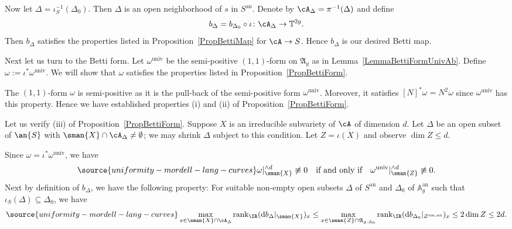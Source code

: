 Now let $\Delta = \iota_S^{-1}(\Delta_0)$. Then $\Delta$ is an open neighborhood of $s$ in $S^{\mathrm{an}}$. Denote by $\cA_{\Delta} = \pi^{-1}(\Delta)$ and define
\[
b_{\Delta} = b_{\Delta_0} \circ \iota \colon \cA_{\Delta} \rightarrow \mathbb T^{2g}.
\]
Then $b_{\Delta}$ satisfies the properties listed in Proposition~\ref{PropBettiMap} for $\cA \rightarrow S$. Hence $b_{\Delta}$ is our desired Betti map.


Next let us turn to the Betti form. Let $\omega^{\mathrm{univ}}$ be the semi-positive $(1,1)$-form on $\mathfrak{A}_g$ as in Lemma~\ref{LemmaBettiFormUnivAb}. Define $\omega:= \iota^*\omega^{\mathrm{univ}}$. We will show that $\omega$ satisfies the properties listed in Proposition~\ref{PropBettiForm}.

The $(1,1)$-form $\omega$ is semi-positive as it is the pull-back of
the semi-positive form $\omega^{\mathrm{univ}}$. Moreover, it satisfies
$[N]^*\omega = N^2 \omega$ since $\omega^{\mathrm{univ}}$ has this
property. Hence we have established properties (i) and (ii) of
Proposition~\ref{PropBettiForm}.

Let us verify (iii) of Proposition~\ref{PropBettiForm}. Suppose $X$ is
an irreducible subvariety of $\cA$ of dimension $d$.
Let $\Delta$ be an open subset of $\an{S}$ with
$\sman{X}\cap\cA_\Delta\not=\emptyset$; we may shrink $\Delta$ subject
to this condition.
Let $Z
= \overline{\iota(X)}$ and observe $\dim Z \le d$.

Since $\omega = \iota^*\omega^{\mathrm{univ}}$, we have
\begin{equation}\label{EqOmegaAndOmegaUniv}
\source{uniformity-mordell-lang-curves}
\omega|_{\sman{X}}^{\wedge d} \not\equiv 0 \quad\text{if and only if}\quad \omega^{\mathrm{univ}}|_{\sman{Z}}^{\wedge d} \not\equiv 0.
\end{equation}
Next by definition of $b_{\Delta}$, we have the following property:
 For suitable non-empty open subsets $\Delta$ of $S^{\mathrm{an}}$ and
 $\Delta_0$ of $\mathbb{A}_g^{\mathrm{an}}$
 such that $\iota_S(\Delta) \subseteq \Delta_0$, we have
\begin{equation}\label{EqBettiRankTrivialBound}
\source{uniformity-mordell-lang-curves}
\max_{x \in \sman{X} \cap \cA_{\Delta}} \mathrm{rank}_{\IR}
(\mathrm{d}b_{\Delta}|_{\sman{X}})_x
\le \max_{x \in \sman{Z} \cap \mathfrak{A}_{g,\Delta_0}} \mathrm{rank}_{\IR} (\mathrm{d}b_{\Delta_0}|_{Z^{\mathrm{sm,an}}})_x \le 2\dim Z \le 2d.
\end{equation}

